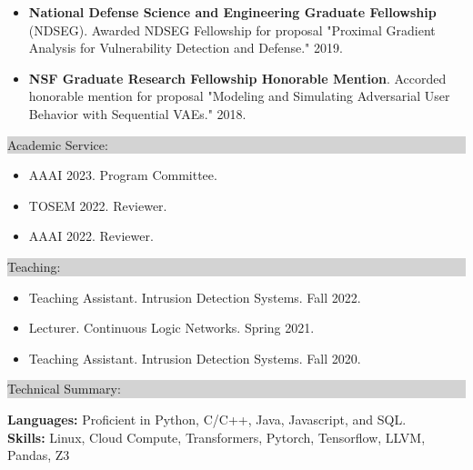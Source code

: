\documentclass{article} %
\newcommand{\rsection}[1]{
  \hspace{-0.4cm}\vspace{0.1cm}
\colorbox{lightgrey}{
\begin{minipage}{1.07\linewidth}
\vspace{0.22cm}
\fontsize{14pt}{16pt}\selectfont #1
\vspace{0.12cm}
\end{minipage}
}
\vspace*{-0.1cm}
}
\begin{document}
\vspace{0.2cm}
\begin{minipage}{1.01\linewidth}
\begin{itemize}[label={},itemindent=-2em,leftmargin=2em, parsep=4pt]
  \item {\bf National Defense Science and Engineering Graduate Fellowship} (NDSEG). Awarded NDSEG Fellowship for proposal "Proximal Gradient Analysis for Vulnerability Detection and Defense." 2019.
  \item {\bf NSF Graduate Research Fellowship Honorable Mention}. Accorded honorable mention for proposal "Modeling and Simulating Adversarial User Behavior with Sequential VAEs." 2018.
  \end{itemize}
\end{minipage}


\rsection{Academic Service:}
\hspace*{-0.1cm}
\begin{minipage}{1.01\linewidth}
\begin{itemize}[label={},itemindent=-2em,leftmargin=2em, parsep=4pt]
  \item AAAI 2023. Program Committee.
  \item TOSEM 2022. Reviewer.
  \item AAAI 2022. Reviewer.
  \end{itemize}
\end{minipage}

\vspace{0.2cm}
\rsection{Teaching:}
\hspace*{-0.1cm}
\begin{minipage}{1.01\linewidth}
\begin{itemize}[label={},itemindent=-2em,leftmargin=2em, parsep=4pt]
  \item Teaching Assistant. Intrusion Detection Systems. Fall 2022.
  \item Lecturer. Continuous Logic Networks. Spring 2021.
  \item Teaching Assistant. Intrusion Detection Systems. Fall 2020.
  \end{itemize}
\end{minipage}

\vspace{0.2cm}
\rsection{Technical Summary:}

\hspace*{-0.3cm}
\textbf{Languages:} Proficient in Python, C/C++, Java, Javascript, and SQL. \\
\hspace*{-0.3cm}
\textbf{Skills:} Linux, Cloud Compute, Transformers, Pytorch, Tensorflow, LLVM, Pandas, Z3
\end{document}
